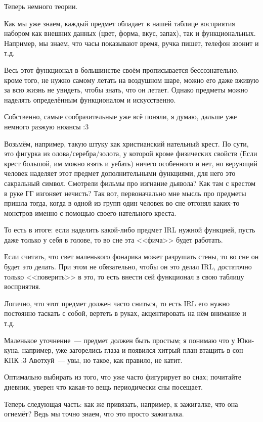 \documentclass[a5paper,12pt,twoside]{memoir}
\begin{document}
Теперь немного теории.
 
Как мы уже знаем, каждый предмет обладает в нашей таблице восприятия набором как внешних данных (цвет, форма, вкус, запах), так и функциональных. Например, мы знаем, что часы показывают время, ручка пишет, телефон звонит и т.д.
 
Весь этот функционал в большинстве своём прописывается бессознательно, кроме того, не нужно самому летать на воздушном шаре, можно его даже вживую за всю жизнь не увидеть, чтобы знать, что он летает. Однако предметы можно наделять определённым функционалом и искусственно. 

Собственно, самые сообразительные уже всё поняли, я думаю, дальше уже немного разжую нюансы :3 

Возьмём, например, такую штуку как христианский нательный крест. По сути, это фигурка из олова/серебра/золота, у которой кроме фи\-зи\-чес\-ких свой\-ств (Если крест большой, им можно взять и уебать) ничего особенного и нет, но верующий человек наделяет этот предмет дополнительными функциями, для него это сакральный символ. Смотрели фильмы про изгнание дьявола? Как там с крестом в руке ГГ изгоняет нечисть? Так вот, первоначально мне мысль про предметы пришла тогда, когда в одной из групп один человек во сне отгонял каких-то монстров именно с помощью своего нательного креста. 

То есть в итоге: если наделить какой-либо предмет IRL нужной функцией, пусть даже только у себя в голове, то во сне эта <<фича>> будет работать.
 
Если считать, что свет маленького фонарика может разрушать стены, то во сне он будет это делать. При этом не обязательно, чтобы он это делал IRL, достаточно только <<поверить>> в это, то есть внести сей функционал в свою таблицу восприятия. 

Логично, что этот предмет должен часто сниться, то есть IRL его нужно постоянно таскать с собой, вертеть в руках, акцентировать на нём внимание и т.д.

Маленькое уточнение~--- предмет должен быть простым; я понимаю что у Юки-куна, например, уже загорелись глаза и появился хитрый план втащить в сон КПК :3 Авотхуй~--- увы, но такое, как правило, не катит.

Оптимально выбирать из того, что уже часто фигурирует во снах; почитайте дневник, уверен что ка\-ка\-я-то вещь периодически сны посещает.

Теперь следующая часть: как же привязать, например, к зажигалке, что она огнемёт? Ведь мы точно знаем, что это просто зажигалка.
\end{document}
